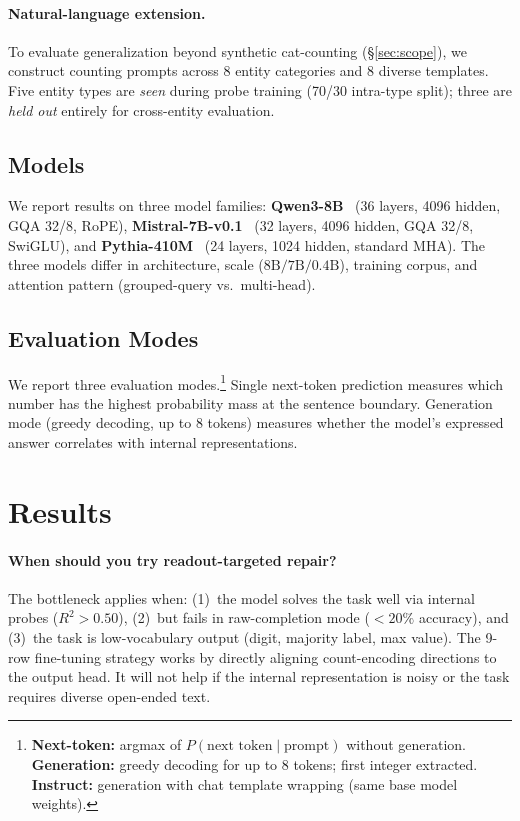 \documentclass{article}
\begin{document}
\paragraph{Natural-language extension.}
To evaluate generalization beyond synthetic cat-counting (\S\ref{sec:scope}),
we construct counting prompts across 8 entity categories
and 8 diverse templates.
Five entity types are \emph{seen} during probe training (70/30 intra-type split);
three are \emph{held out} entirely for cross-entity evaluation.

\subsection{Models}

We report results on three model families:
\textbf{Qwen3-8B}~\citep{qwen3} (36 layers, 4096 hidden, GQA 32/8, RoPE),
\textbf{Mistral-7B-v0.1}~\citep{jiang2023mistral} (32 layers, 4096 hidden, GQA 32/8, SwiGLU),
and \textbf{Pythia-410M}~\citep{biderman2023pythia} (24 layers, 1024 hidden, standard MHA).
The three models differ in architecture, scale ($8\text{B}/7\text{B}/0.4\text{B}$), training corpus, and attention pattern (grouped-query vs.\ multi-head).

\subsection{Evaluation Modes}

We report three evaluation modes.\footnote{%
  \textbf{Next-token:} argmax of $P(\text{next token} \mid \text{prompt})$ without generation.
  \textbf{Generation:} greedy decoding for up to 8 tokens; first integer extracted.
  \textbf{Instruct:} generation with chat template wrapping (same base model weights).}
Single next-token prediction measures which number has the highest probability mass at the sentence boundary.
Generation mode (greedy decoding, up to 8 tokens) measures whether the model's expressed answer correlates with internal representations.

\section{Results}
\label{sec:results}

\paragraph{When should you try readout-targeted repair?}
The bottleneck applies when:
(1)~the model solves the task well via internal probes ($R^2 > 0.50$),
(2)~but fails in raw-completion mode ($< 20\%$ accuracy),
and (3)~the task is low-vocabulary output (digit, majority label, max value).
The 9-row fine-tuning strategy works by directly aligning count-encoding directions to the output head.
It will not help if the internal representation is noisy or the task requires diverse open-ended text.
\end{document}
